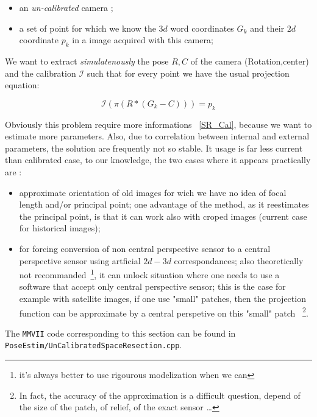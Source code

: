 \begin{itemize}
   \item an \emph{un-calibrated} camera ;
   \item a set of point for which we know the  $3d$ word coordinates $G_k$ and their 
        $2d$ coordinate $p_k$ in a image acquired with this camera;
\end{itemize}


We want to extract \emph{simulatenously} the pose $R,C$ of the camera (Rotation,center)  and the calibration
$\mathcal I$ such that for every point we have the usual projection equation:

\begin{equation}
       \mathcal I(\pi (R*(G_k-C))) = p_k \label{EQ:PROJ}
\end{equation}

Obviously this problem require more informations ~\ref{SR_Cal}, because we want to estimate more parameters.
Also, due to correlation between internal and external parameters, the solution
are frequently not so stable. It usage is far less current than calibrated case,
to our knowledge, the two cases where it appears practically are :


\begin{itemize}
   \item approximate  orientation of old images for wich we have no idea of focal length and/or principal
        point; one advantage of the method, as it reestimates the principal point, is that it can work
        also with croped images (current case for historical images);

   \item for forcing conversion of  non central perspective sensor to a central perspective sensor
        using  artficial $2d-3d$ correspondances; also theoretically not recommanded~\footnote{it's
        always better to use rigourous modelization when we can}, it can unlock situation where one needs to
        use a software that accept only central perspective sensor; this is the case for example
        with satellite images, if one use "small" patches, then the projection  function can be
        approximate by a central perspetive on this "small" patch ~\footnote{In fact, the accuracy of
        the approximation is a difficult question, depend of the size of the patch, of relief, 
        of the exact sensor \dots}.
\end{itemize}

The {\tt MMVII} code corresponding to this section can be found in 
{\tt PoseEstim/UnCalibratedSpaceResection.cpp}.

